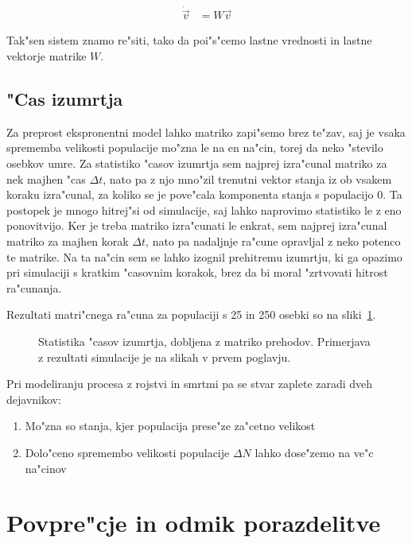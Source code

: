 \documentclass[a4paper,10pt]{article}
\begin{document}
\begin{align}
  \dot {\vec v} &= W \vec v
\end{align}

Tak"sen sistem znamo re"siti, tako da poi"s"cemo lastne vrednosti in lastne vektorje matrike $W$. 

\subsection{"Cas izumrtja}

Za preprost ekspronentni model lahko matriko zapi"semo brez te"zav, saj je vsaka sprememba velikosti populacije mo"zna le na en na"cin, torej da neko "stevilo osebkov umre. Za statistiko "casov izumrtja sem najprej izra"cunal matriko za nek majhen "cas $\Delta t$, nato pa z njo mno"zil trenutni vektor stanja iz ob vsakem koraku izra"cunal, za koliko se je pove"cala komponenta stanja s populacijo 0. Ta postopek je mnogo hitrej"si od simulacije, saj lahko naprovimo statistiko le z eno ponovitvijo. Ker je treba matriko izra"cunati le enkrat, sem najprej izra"cunal matriko za majhen korak $\Delta t$, nato pa nadaljnje ra"cune opravljal z neko potenco te matrike. Na ta na"cin sem se lahko izognil prehitremu izumrtju, ki ga opazimo pri simulaciji s kratkim "casovnim korakok, brez da bi moral "zrtvovati hitrost ra"cunanja. 

Rezultati matri"cnega ra"cuna za populaciji s 25 in 250 osebki so na sliki~\ref{fig:matrike-exp}. 

\begin{figure}
 
  \caption{Statistika "casov izumrtja, dobljena z matriko prehodov. Primerjava z rezultati simulacije je na slikah v prvem poglavju. }
  \label{fig:matrike-exp}
\end{figure}

Pri modeliranju procesa z rojstvi in smrtmi pa se stvar zaplete zaradi dveh dejavnikov:

\begin{enumerate}
 \item Mo"zna so stanja, kjer populacija prese"ze za"cetno velikost
 \item Dolo"ceno spremembo velikosti populacije $\Delta N$ lahko dose"zemo na ve"c na"cinov
\end{enumerate}

\section{Povpre"cje in odmik porazdelitve}
\end{document}
